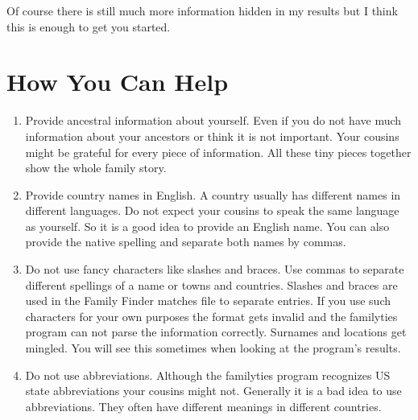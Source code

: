 \documentclass[12pt,a4paper]{article}
\begin{document}
Of course there is still much more information hidden in 
my results but I think this is enough to get you started.


\section{How You Can Help}

\begin{enumerate}
\item Provide ancestral information about yourself. Even if
  you do not have much information about your ancestors or
  think it is not important. Your cousins might be grateful
  for every piece of information. All these tiny pieces
  together show the whole family story.

\item Provide country names in English. A country usually has
  different names in different languages. Do not expect your
  cousins to speak the same language as yourself. So it is a
  good idea to provide an English name. You can also provide
  the native spelling and separate both names by commas.

\item Do not use fancy characters like slashes and braces.
  Use commas to separate different spellings of a name or
  towns and countries. Slashes and braces are used in the
  Family Finder matches file to separate entries. If you 
  use such characters for your own purposes the format gets
  invalid and the familyties program can not parse the
  information correctly. Surnames and locations get mingled.
  You will see this sometimes when looking at the
  program's results.

\item Do not use abbreviations. Although the familyties
  program recognizes US state abbreviations your cousins
  might not. Generally it is a bad idea to use abbreviations.
  They often have different meanings in different countries.
\end{enumerate}
\end{document}
